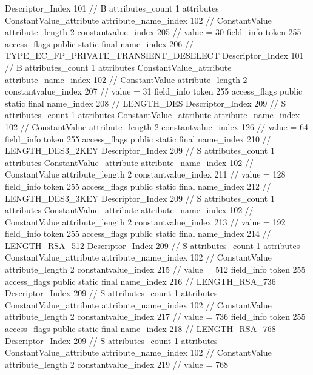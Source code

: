 {{{{{				Descriptor_Index	101		// B
				attributes_count	1
				attributes {
				ConstantValue_attribute {
					attribute_name_index	102		// ConstantValue
					attribute_length	2
					constantvalue_index	205		// value = 30
				}
				}
			}
			field_info {
				token	255
				access_flags	public static final
				name_index	206		// TYPE_EC_FP_PRIVATE_TRANSIENT_DESELECT
				Descriptor_Index	101		// B
				attributes_count	1
				attributes {
				ConstantValue_attribute {
					attribute_name_index	102		// ConstantValue
					attribute_length	2
					constantvalue_index	207		// value = 31
				}
				}
			}
			field_info {
				token	255
				access_flags	public static final
				name_index	208		// LENGTH_DES
				Descriptor_Index	209		// S
				attributes_count	1
				attributes {
				ConstantValue_attribute {
					attribute_name_index	102		// ConstantValue
					attribute_length	2
					constantvalue_index	126		// value = 64
				}
				}
			}
			field_info {
				token	255
				access_flags	public static final
				name_index	210		// LENGTH_DES3_2KEY
				Descriptor_Index	209		// S
				attributes_count	1
				attributes {
				ConstantValue_attribute {
					attribute_name_index	102		// ConstantValue
					attribute_length	2
					constantvalue_index	211		// value = 128
				}
				}
			}
			field_info {
				token	255
				access_flags	public static final
				name_index	212		// LENGTH_DES3_3KEY
				Descriptor_Index	209		// S
				attributes_count	1
				attributes {
				ConstantValue_attribute {
					attribute_name_index	102		// ConstantValue
					attribute_length	2
					constantvalue_index	213		// value = 192
				}
				}
			}
			field_info {
				token	255
				access_flags	public static final
				name_index	214		// LENGTH_RSA_512
				Descriptor_Index	209		// S
				attributes_count	1
				attributes {
				ConstantValue_attribute {
					attribute_name_index	102		// ConstantValue
					attribute_length	2
					constantvalue_index	215		// value = 512
				}
				}
			}
			field_info {
				token	255
				access_flags	public static final
				name_index	216		// LENGTH_RSA_736
				Descriptor_Index	209		// S
				attributes_count	1
				attributes {
				ConstantValue_attribute {
					attribute_name_index	102		// ConstantValue
					attribute_length	2
					constantvalue_index	217		// value = 736
				}
				}
			}
			field_info {
				token	255
				access_flags	public static final
				name_index	218		// LENGTH_RSA_768
				Descriptor_Index	209		// S
				attributes_count	1
				attributes {
				ConstantValue_attribute {
					attribute_name_index	102		// ConstantValue
					attribute_length	2
					constantvalue_index	219		// value = 768
}}}}}}}
